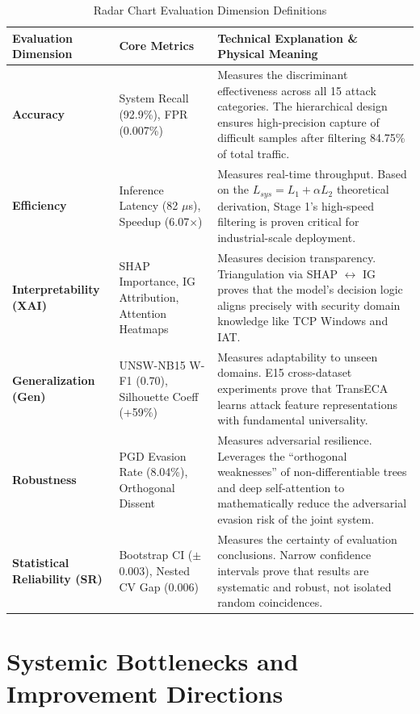 \documentclass[sigconf]{acmart}
\begin{document}
\begin{table}[H]
\caption{Radar Chart Evaluation Dimension Definitions}
\label{tab:radar_dimensions}
\begin{tabular}{p{3cm}p{5cm}p{7cm}}
\toprule
\textbf{Evaluation Dimension} & \textbf{Core Metrics} & \textbf{Technical Explanation \& Physical Meaning} \\
\midrule
\textbf{Accuracy} & System Recall (92.9\%), FPR (0.007\%) & Measures the discriminant effectiveness across all 15 attack categories. The hierarchical design ensures high-precision capture of difficult samples after filtering 84.75\% of total traffic. \\
\textbf{Efficiency} & Inference Latency (82 $\mu$s), Speedup (6.07$\times$) & Measures real-time throughput. Based on the $L_{sys} = L_1 + \alpha L_2$ theoretical derivation, Stage 1's high-speed filtering is proven critical for industrial-scale deployment. \\
\textbf{Interpretability (XAI)} & SHAP Importance, IG Attribution, Attention Heatmaps & Measures decision transparency. Triangulation via SHAP $\leftrightarrow$ IG proves that the model's decision logic aligns precisely with security domain knowledge like TCP Windows and IAT. \\
\textbf{Generalization (Gen)} & UNSW-NB15 W-F1 (0.70), Silhouette Coeff (+59\%) & Measures adaptability to unseen domains. E15 cross-dataset experiments prove that TransECA learns attack feature representations with fundamental universality. \\
\textbf{Robustness} & PGD Evasion Rate (8.04\%), Orthogonal Dissent & Measures adversarial resilience. Leverages the ``orthogonal weaknesses'' of non-differentiable trees and deep self-attention to mathematically reduce the adversarial evasion risk of the joint system. \\
\textbf{Statistical Reliability (SR)} & Bootstrap CI ($\pm$0.003), Nested CV Gap (0.006) & Measures the certainty of evaluation conclusions. Narrow confidence intervals prove that results are systematic and robust, not isolated random coincidences. \\
\bottomrule
\end{tabular}
\end{table}

\section{Systemic Bottlenecks and Improvement Directions}
\end{document}
